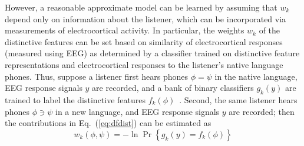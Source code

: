 However, a reasonable approximate model can be learned by assuming
that $w_k$ depend only on information about the listener, which can be
incorporated via measurements of electrocortical activity. In
particular, the weights $w_k$ of the distinctive features can be set
based on similarity of electrocortical responses (measured using EEG)
as determined by a classifier trained on distinctive feature
representations and electrocortical responses to the listener's native
language phones.
Thus, suppose a listener first hears phones $\phi=\psi$ in the native
language, EEG response signals $y$ are recorded, and a bank of
binary classifiers $g_k(y)$ are trained to label the distinctive
features $f_k(\phi)$~\cite{Liberto15}.  Second, the same listener
hears phones $\phi\ni\psi$ in a new language, and EEG response
signals $y$ are recorded;
then the contributions in
Eq.~(\ref{eq:dfdist}) can be estimated as
\begin{equation}
  w_k(\phi,\psi) = -\ln\Pr\left\{g_k(y)= f_k(\phi)\right\}
  \label{eq:eegdist}
\end{equation}
